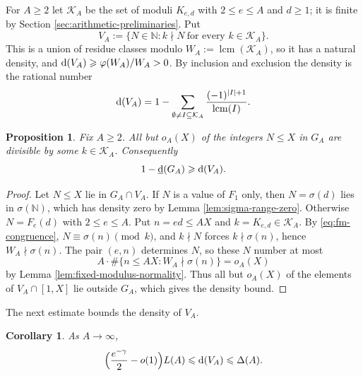 \documentclass[11pt,letterpaper,reqno]{amsart}
\numberwithin{equation}{section}
\newtheorem{proposition}[theorem]{Proposition}
\newtheorem{corollary}[theorem]{Corollary}
\theoremstyle{remark}
\newcommand{\N}{\mathbb{N}}
\newcommand{\lowerdens}{\underline{\textup{d}}}
\DeclareMathOperator{\lcm}{lcm}
\renewcommand{\leq}{\leqslant}
\renewcommand{\geq}{\geqslant}
\begin{document}
For $A\geq2$ let $\mathcal{K}_A$ be the set of moduli $K_{e,d}$ with
$2\leq e\leq A$ and $d\geq1$; it is finite by
Section \ref{sec:arithmetic-preliminaries}. Put
\[
 V_A:=\{N\in\N:k\nmid N\ \text{for every }k\in\mathcal{K}_A\} .
\]
This is a union of residue classes modulo $W_A:=\lcm(\mathcal{K}_A)$, so it has
a natural density, and $\textup{d}(V_A)\geq\varphi(W_A)/W_A>0$. By inclusion and
exclusion the density is the rational number
\[
 \textup{d}(V_A)=1-\sum_{\emptyset\neq I\subseteq\mathcal{K}_A}
 \frac{(-1)^{|I|+1}}{\lcm(I)} .
\]
\begin{proposition}\label{prop:fm-envelope}
Fix $A\geq2$. All but $o_A(X)$ of the integers $N\leq X$ in $G_A$ are
divisible by some $k\in\mathcal{K}_A$. Consequently
\[
 1-\lowerdens(G_A)\geq \textup{d}(V_A) .
\]
\end{proposition}
\begin{proof}
Let $N\leq X$ lie in $G_A\cap V_A$. If $N$ is a value of $F_1$ only, then
$N=\sigma(d)$ lies in $\sigma(\N)$, which has density zero by
Lemma \ref{lem:sigma-range-zero}. Otherwise $N=F_e(d)$ with
$2\leq e\leq A$. Put $n=ed\leq AX$ and $k=K_{e,d}\in\mathcal{K}_A$. By
\eqref{eq:fm-congruence}, $N\equiv\sigma(n)\pmod k$, and $k\nmid N$ forces
$k\nmid\sigma(n)$, hence $W_A\nmid\sigma(n)$. The pair $(e,n)$ determines
$N$, so these $N$ number at most
\[
 A\cdot\#\{n\leq AX:W_A\nmid\sigma(n)\}=o_A(X)
\]
by Lemma \ref{lem:fixed-modulus-normality}. Thus all but $o_A(X)$ of the
elements of $V_A\cap[1,X]$ lie outside $G_A$, which gives the density
bound.
\end{proof}
The next estimate bounds the density of $V_A$.
\begin{corollary}\label{cor:fm-envelope-tail}
As $A\to\infty$,
\[
 \Bigl(\frac{e^{-\gamma}}2-o(1)\Bigr)L(A)\leq \textup{d}(V_A)\leq\Delta(A) .
\]
\end{corollary}
\end{document}
